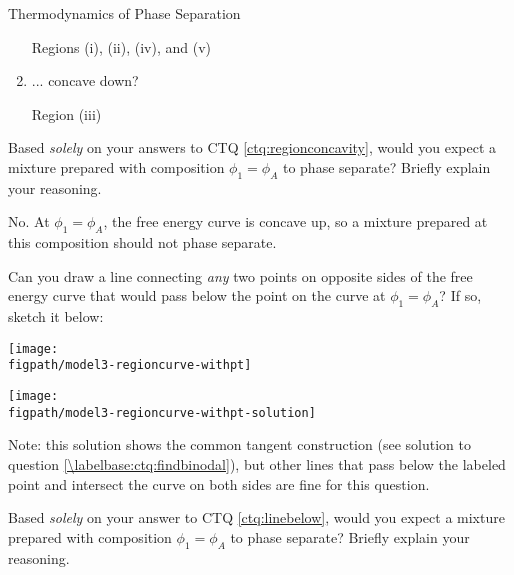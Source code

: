 \begin{activity}{Thermodynamics of Phase Separation}
\begin{ctqs}
\begin{enumerate}
					\begin{solution}[0.75in]{}
					
						Regions (i), (ii), (iv), and (v)
						
					\end{solution}
				\item ... concave down?
					
					\begin{solution}[0.75in]{}
					
						Region (iii)
						
					\end{solution}
					
			\end{enumerate}
			
		\question \label{ctq:phaseseplocal} Based \emph{solely} on your answers to CTQ \ref{ctq:regionconcavity}, would you expect a mixture prepared with composition $\phi_1 = \phi_A$ to phase separate?  Briefly explain your reasoning.
					
					\begin{solution}[1.75in]
					
						No. At $\phi_1 = \phi_A$, the free energy curve is concave up, so a mixture prepared at this composition should not phase separate.
					
					\end{solution}
		
		\question \label{ctq:linebelow} Can you draw a line connecting \emph{any} two points on opposite sides of the free energy curve that would pass below the point on the curve at $\phi_1=\phi_A$?  If so, sketch it below:

			\begin{solution}[2.5in]{
					\centerline{\texttt{[image: \\figpath/model3-regioncurve-withpt]}}
				}
					\centerline{\texttt{[image: \\figpath/model3-regioncurve-withpt-solution]}}
					
					Note: this solution shows the common tangent construction (see solution to question \ref{\labelbase:ctq:findbinodal}), but other lines that pass below the labeled point and intersect the curve on both sides are fine for this question.
				
			\end{solution}
		
		\question \label{ctq:phasesepglobal} Based \emph{solely} on your answer to CTQ \ref{ctq:linebelow}, would you expect a mixture prepared with composition $\phi_1 = \phi_A$ to phase separate?  Briefly explain your reasoning.
		

\end{ctqs}
\end{activity}
